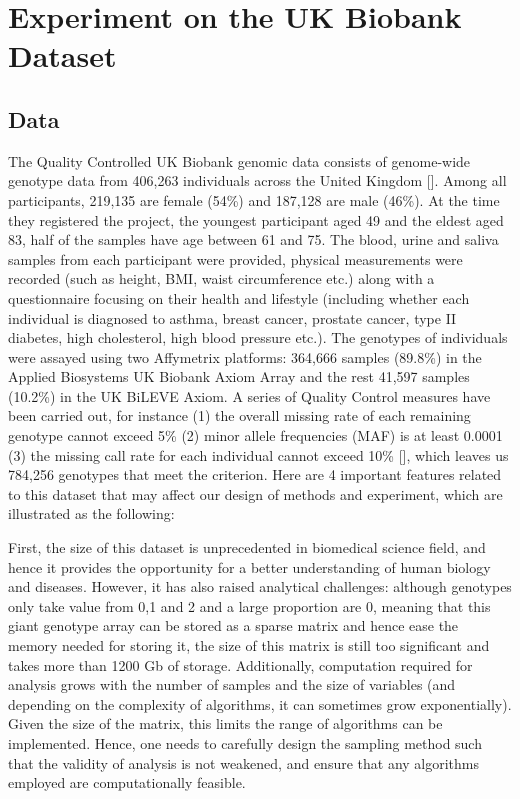 \documentclass[a4paper,12pt]{article}
\begin{document}
\pagebreak
%
%
%
%
%
%
\section{Experiment on the UK Biobank Dataset} \label{Data}
\subsection{Data} \label{biodata}
The Quality Controlled UK Biobank genomic data consists of genome-wide genotype data from 406,263 individuals across the United Kingdom [\cite{bycroft2018uk}]. Among all participants, 219,135 are female (54\%) and 187,128 are male (46\%). At the time they registered the project, the youngest participant aged 49 and the eldest aged 83, half of the samples have age between 61 and 75. The blood, urine and saliva samples from each participant were provided, physical measurements were recorded (such as height, BMI, waist circumference etc.) along with a questionnaire focusing on their health and lifestyle (including whether each individual is diagnosed to asthma, breast cancer, prostate cancer, type II diabetes, high cholesterol, high blood pressure etc.). The genotypes of individuals were assayed using two Affymetrix platforms: 364,666 samples (89.8\%) in the Applied Biosystems UK Biobank Axiom Array and the rest 41,597 samples (10.2\%) in the UK BiLEVE Axiom. A series of Quality Control measures have been carried out, for instance (1) the overall missing rate of each remaining genotype cannot exceed 5\% (2) minor allele frequencies (MAF) is at least 0.0001 (3) the missing call rate for each individual cannot exceed 10\% [\cite{biobank2015genotyping}], which leaves us 784,256 genotypes that meet the criterion. Here are 4 important features related to this dataset that may affect our design of methods and experiment, which are illustrated as the following:

First, the size of this dataset is unprecedented in biomedical science field, and hence it provides the opportunity for a better understanding of human biology and diseases. However, it has also raised analytical challenges: although genotypes only take value from 0,1 and 2 and a large proportion are 0, meaning that this giant genotype array can be stored as a sparse matrix and hence ease the memory needed for storing it, the size of this matrix is still too significant and takes more than 1200 Gb of storage. Additionally, computation required for analysis grows with the number of samples and the size of variables (and depending on the complexity of algorithms, it can sometimes grow exponentially). Given the size of the matrix, this limits the range of algorithms can be implemented. Hence, one needs to carefully design the sampling method such that the validity of analysis is not weakened, and ensure that any algorithms employed are computationally feasible. 
\end{document}
